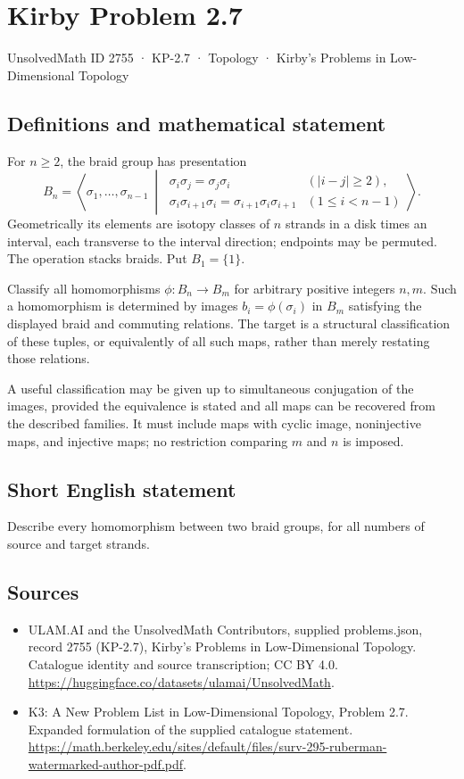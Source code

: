 \documentclass[11pt,a4paper]{article}
\begin{document}
\section*{Kirby Problem 2.7}\label{2755}
{\small UnsolvedMath ID 2755 · KP-2.7 · Topology · Kirby's Problems in Low-Dimensional Topology}
\subsection{Definitions and mathematical statement}
For $n\geq2$, the braid group has presentation
\[
B_n=\left\langle\sigma_1,\ldots,\sigma_{n-1}\ \middle|\
\begin{array}{ll}
\sigma_i\sigma_j=\sigma_j\sigma_i&(|i-j|\geq2),\\
\sigma_i\sigma_{i+1}\sigma_i=\sigma_{i+1}\sigma_i\sigma_{i+1}&(1\leq i<n-1)
\end{array}\right\rangle .
\]
Geometrically its elements are isotopy classes of $n$ strands in a disk times
an interval, each transverse to the interval direction; endpoints may be
permuted. The operation stacks braids. Put $B_1=\{1\}$.

Classify all homomorphisms $\phi:B_n\to B_m$ for arbitrary positive integers
$n,m$. Such a homomorphism is determined by images $b_i=\phi(\sigma_i)$ in
$B_m$ satisfying the displayed braid and commuting relations. The target is a
structural classification of these tuples, or equivalently of all such maps,
rather than merely restating those relations.

A useful classification may be given up to simultaneous conjugation of the
images, provided the equivalence is stated and all maps can be recovered from
the described families. It must include maps with cyclic image, noninjective
maps, and injective maps; no restriction comparing $m$ and $n$ is imposed.
\subsection{Short English statement}
Describe every homomorphism between two braid groups, for all numbers of source and target strands.
\subsection{Sources}
\begin{itemize}
\item[S1] ULAM.AI and the UnsolvedMath Contributors, supplied problems.json, record 2755 (KP-2.7), Kirby's Problems in Low-Dimensional Topology. Catalogue identity and source transcription; CC BY 4.0.
\url{https://huggingface.co/datasets/ulamai/UnsolvedMath}.
\item[S2] K3: A New Problem List in Low-Dimensional Topology, Problem 2.7. Expanded formulation of the supplied catalogue statement.
\url{https://math.berkeley.edu/sites/default/files/surv-295-ruberman-watermarked-author-pdf.pdf}.
\end{itemize}
\end{document}
